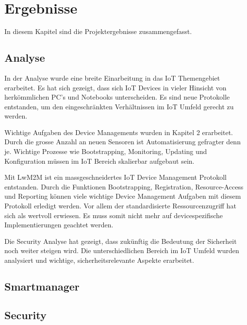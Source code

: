 \chapter{Ergebnisse}
In diesem Kapitel sind die Projektergebnisse zusammengefasst. 
\section{Analyse}
In der Analyse wurde eine breite Einarbeitung in das IoT Themengebiet erarbeitet. Es hat sich gezeigt, dass sich IoT Devices in vieler Hinsicht von herkömmlichen PC's und Notebooks unterscheiden. Es sind neue Protokolle entstanden, um den eingeschränkten Verhältnissen im IoT Umfeld gerecht zu werden.

Wichtige Aufgaben des Device Managements wurden in Kapitel 2 erarbeitet. Durch die grosse Anzahl an neuen Sensoren ist Automatisierung gefragter denn je. Wichtige Prozesse wie Bootstrapping, Monitoring, Updating und Konfiguration müssen im IoT Bereich skalierbar aufgebaut sein.

Mit LwM2M ist ein massgeschneidertes IoT Device Management Protokoll entstanden. Durch die Funktionen Bootstrapping, Registration, Resource-Access und Reporting können viele wichtige Device Management Aufgaben mit diesem Protokoll erledigt werden. Vor allem der standardisierte Ressourcenzugriff hat sich als wertvoll erwiesen. Es muss somit nicht mehr auf devicespezifische Implementierungen geachtet werden.

Die Security Analyse hat gezeigt, dass zukünftig die Bedeutung der Sicherheit noch weiter steigen wird. Die unterschiedlichen Bereich im IoT Umfeld wurden analysiert und wichtige, sicherheitsrelevante Aspekte erarbeitet.       
\section{Smartmanager}

\section{Security}